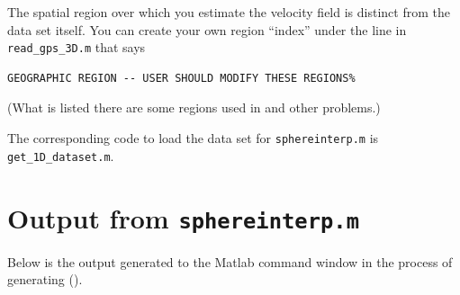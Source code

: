 \documentclass[11pt,titlepage,fleqn]{article}
\begin{document}
The spatial region over which you estimate the velocity field is distinct from the data set itself. You can create your own region ``index'' under the line in \verb+read_gps_3D.m+ that says
% 
\begin{verbatim}
GEOGRAPHIC REGION -- USER SHOULD MODIFY THESE REGIONS%
\end{verbatim}
%
(What is listed there are some regions used in \citet{Tape2009gps} and other problems.)

\bigskip\noindent
The corresponding code to load the data set for \verb+sphereinterp.m+ is \verb+get_1D_dataset.m+.

{}




\appendix

\pagebreak
\section{Output from {\tt sphereinterp.m}}
\label{sec:sphereinterp_out}

Below is the output generated to the Matlab command window in the process of generating  ().
\end{document}
